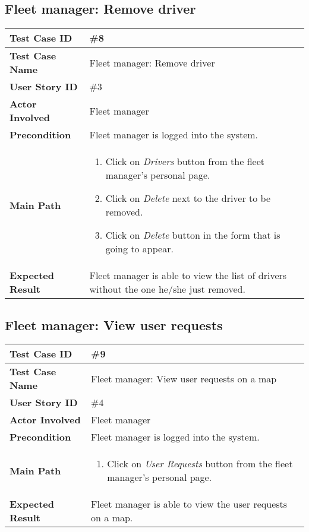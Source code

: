 \subsection{Fleet manager: Remove driver}
\begin{center}
	\begin{tabular} { | m{3.5cm} | m{9.5cm} | }
		\hline
		\textbf{Test Case ID} & \#8\\
		\hline
		\textbf{Test Case Name} & Fleet manager: Remove driver\\
		\hline
		\textbf{User Story ID} & \#3 \\
		\hline
		\textbf{Actor Involved} & Fleet manager\\
		\hline
		\textbf{Precondition} & Fleet manager is logged into the system.\\
		\hline
		\textbf{Main Path} & 
		\begin{enumerate}
			\item Click on \textit{Drivers} button from the fleet manager's personal page.
			\item Click on \textit{Delete} next to the driver to be removed.
			\item Click on \textit{Delete} button in the form that is going to appear.
		\end{enumerate}\\
		\hline
		\textbf{Expected Result} & Fleet manager is able to view the list of drivers without the one he/she just removed.\\
		\hline
	\end{tabular}
\end{center}

\subsection{Fleet manager: View  user requests}
\begin{center}
	\begin{tabular} { | m{3.5cm} | m{9.5cm} | }
		\hline
		\textbf{Test Case ID} & \#9\\
		\hline
		\textbf{Test Case Name} & Fleet manager: View user requests on a map\\
		\hline
		\textbf{User Story ID} & \#4 \\
		\hline
		\textbf{Actor Involved} & Fleet manager\\
		\hline
		\textbf{Precondition} & Fleet manager is logged into the system.\\
		\hline
		\textbf{Main Path} & 
		\begin{enumerate}
			\item Click on \textit{User Requests} button from the fleet manager's personal page.
		\end{enumerate}\\
		\hline
		\textbf{Expected Result} & Fleet manager is able to view the user requests on a map.\\
		\hline
	\end{tabular}
\end{center}
\newpage
